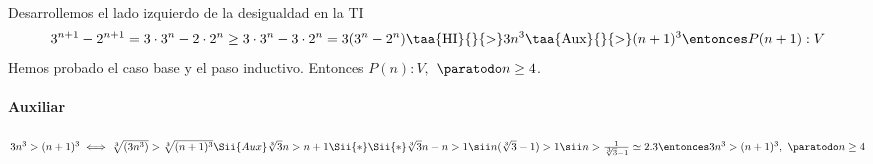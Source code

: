 \begin{enumerate}[label=\roman*)]
        Desarrollemos el lado izquierdo de la desigualdad en la TI
        \begin{align*}
          3^{n+1} - 2^{n+1} = 3 \cdot 3^n - 2 \cdot 2^n \geq 3 \cdot 3^n - 3 \cdot 2^n = 3(3^n - 2^n)
                \taa{\text{HI}}{}{>} 3n^3 \taa{\text{Aux}}{}{>} (n+1)^3 \entonces P(n+1):V
        \end{align*}
        Hemos probado el caso base y el paso inductivo. Entonces $P(n):V,$ $\paratodo n \geq 4$.

                \paragraph{Auxiliar}{$3n^3 > (n+1)^3 \iff \sqrt[3]{(3n^3)} > \sqrt[3]{(n+1)^3} \Sii{Aux}
                \sqrt[3]{3}n > n+1 \Sii{*} \\
                \Sii{*} \sqrt[3]{3}n - n > 1 \sii n(\sqrt[3]{3}-1) > 1 \sii n > \frac{1}{\sqrt[3]{3}-1} \simeq 2.3
            \entonces 3n^3 > (n+1)^3, \ \paratodo n \geq 4$}


\end{enumerate}
